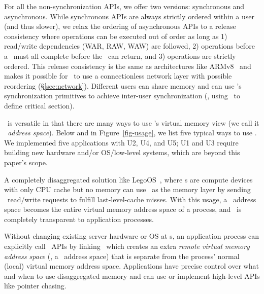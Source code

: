 

For all the non-synchronization APIs, we offer two versions: synchronous and asynchronous.
While synchronous APIs are always strictly ordered within a user (and thus slower),
we relax the ordering of asynchronous APIs to a release consistency where operations can be executed out of order as long as 
1) read/write dependencies (WAR, RAW, WAW) are followed,
2) operations before a \fence\ must all complete before the \fence\ can return,
and 3) \fence{} operations are strictly ordered.
This release consistency is the same as architectures like ARMv8~\cite{ARMv8} and makes it possible for \sys\ to use a connectionless network layer with possible reordering (\S\ref{sec:network}).
Different users can share memory and can use \sys's synchronization primitives to achieve inter-user synchronization (\eg, using \tas\ to define critical section). 
\fi

\sys\ is versatile in that there are many ways to use \sys's virtual memory view (we call it {\em \sys\ address space}).
Below and in Figure~\ref{fig-usage}, we list five typical ways to use \sys.
We implemented five applications with U2, U4, and U5;
U1 and U3 require building new hardware and/or OS/low-level systems, which are beyond this paper's scope.

A completely disaggregated solution like LegoOS~\cite{Shan18-OSDI}, where \CN{}s are compute devices with only CPU cache but no memory
can use \sys\ as the memory layer by sending \sys\ read/write requests to fulfill 
last-level-cache misses. %
With this usage, a \sys\ address space becomes the entire virtual memory address space
of a process, and \sys\ is completely transparent to application processes.

Without changing existing server hardware or OS at \CN{}s, 
an application process can explicitly call \sys\ APIs by linking \syslib\ which creates an extra \textit{remote virtual memory address space} (\ie, a \sys\ address space)
that is separate from the process' normal (local) virtual memory address space.
Applications have precise control over what and when to use disaggregated memory and can use or implement high-level APIs like pointer chasing.

